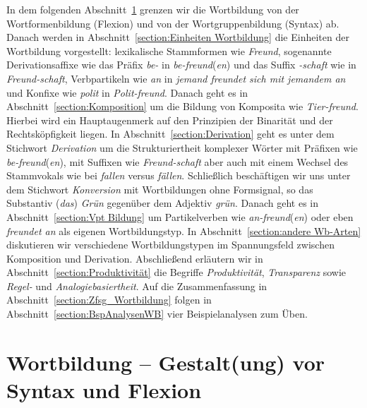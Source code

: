 In dem folgenden Abschnitt~\ref{section:Wortbildung_Einführung} grenzen wir die Wortbildung von der Wortformenbildung (Flexion) und von der Wortgruppenbildung (Syntax) ab. Danach werden in Abschnitt~\ref{section:Einheiten Wortbildung} die Einheiten der Wortbildung vorgestellt: lexikalische Stammformen wie \textit{Freund}, sogenannte Derivationsaffixe wie das Präfix \textit{be-} in \textit{be-freund}(\textit{en}) und das Suffix \textit{-schaft} wie in \textit{Freund-schaft}, Verbpartikeln wie \textit{an} in \textit{jemand freundet sich mit jemandem an} und Konfixe wie \textit{polit} in \textit{Polit-freund}. Danach geht es in Abschnitt~\ref{section:Komposition} um die Bildung von Komposita wie \textit{Tier-freund}. Hierbei wird ein Hauptaugenmerk auf den Prinzipien der Binarität und der Rechtsköpfigkeit liegen. In Abschnitt~\ref{section:Derivation} geht es unter dem Stichwort \textit{Derivation} um die Strukturiertheit komplexer Wörter mit Präfixen wie \textit{be-freund}(\textit{en}), mit Suffixen wie \textit{Freund-schaft} aber auch mit einem Wechsel des Stammvokals wie bei \textit{fallen} versus \textit{fällen}. Schließlich beschäftigen wir uns unter dem Stichwort \textit{Konversion} mit Wortbildungen ohne Formsignal, so \zB das Substantiv (\textit{das}) \textit{Grün} gegenüber dem Adjektiv \textit{grün}. Danach geht es in Abschnitt~\ref{section:Vpt Bildung} um Partikelverben wie \textit{an-freund}(\textit{en}) oder eben \textit{freundet an} als eigenen Wortbildungstyp. In Abschnitt~\ref{section:andere Wb-Arten} diskutieren wir verschiedene Wortbildungstypen im Spannungsfeld zwischen Komposition und Derivation. Abschließend erläutern wir in Abschnitt~\ref{section:Produktivität} die Begriffe \textit{Produktivität}, \textit{Transparenz} sowie \textit{Regel-} und \textit{Analogiebasiertheit}. Auf die Zusammenfassung in Abschnitt~\ref{section:Zfsg_Wortbildung} folgen in Abschnitt~\ref{section:BspAnalysenWB} vier Beispielanalysen zum Üben.   


\section{Wortbildung -- Gestalt(ung) vor Syntax und Flexion}\label{section:Wortbildung_Einführung}

